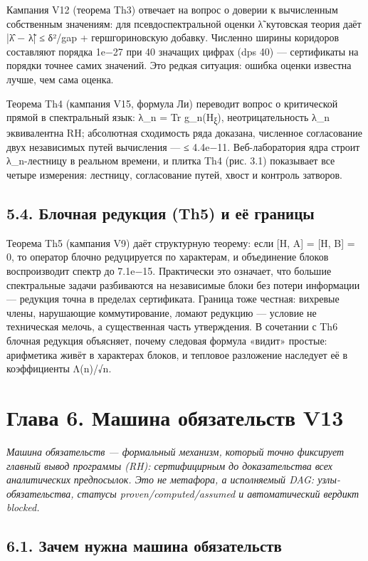 \documentclass[11pt,a4paper]{article}
\begin{document}
Кампания V12 (теорема Th3) отвечает на вопрос о доверии к вычисленным собственным значениям: для псевдоспектральной оценки λ̃ кутовская теория даёт |λ̂ − λ̃| ≤ δ²/gap + гершгориновскую добавку. Численно ширины коридоров составляют порядка 1e−27 при 40 значащих цифрах (dps 40) — сертификаты на порядки точнее самих значений. Это редкая ситуация: ошибка оценки известна лучше, чем сама оценка.

Теорема Th4 (кампания V15, формула Ли) переводит вопрос о критической прямой в спектральный язык: λ\_n = Tr g\_n(H\textsubscript{ξ}), неотрицательность λ\_n эквивалентна RH; абсолютная сходимость ряда доказана, численное согласование двух независимых путей вычисления — ≤ 4.4e−11. Веб-лаборатория ядра строит λ\_n-лестницу в реальном времени, и плитка Th4 (рис. 3.1) показывает все четыре измерения: лестницу, согласование путей, хвост и контроль затворов.

\subsection{5.4. Блочная редукция (Th5) и её границы}

Теорема Th5 (кампания V9) даёт структурную теорему: если [H, A] = [H, B] = 0, то оператор блочно редуцируется по характерам, и объединение блоков воспроизводит спектр до 7.1e−15. Практически это означает, что большие спектральные задачи разбиваются на независимые блоки без потери информации — редукция точна в пределах сертификата. Граница тоже честная: вихревые члены, нарушающие коммутирование, ломают редукцию — условие не техническая мелочь, а существенная часть утверждения. В сочетании с Th6 блочная редукция объясняет, почему следовая формула «видит» простые: арифметика живёт в характерах блоков, и тепловое разложение наследует её в коэффициенты Λ(n)/√n.

\section{Глава 6. Машина обязательств V13}

\noindent\textit{\color{copper}Машина обязательств — формальный механизм, который точно фиксирует главный вывод программы (RH): сертифицирным до доказательства всех аналитических предпосылок. Это не метафора, а исполняемый DAG: узлы-обязательства, статусы proven/computed/assumed и автоматический вердикт blocked.}

\subsection{6.1. Зачем нужна машина обязательств}
\end{document}
